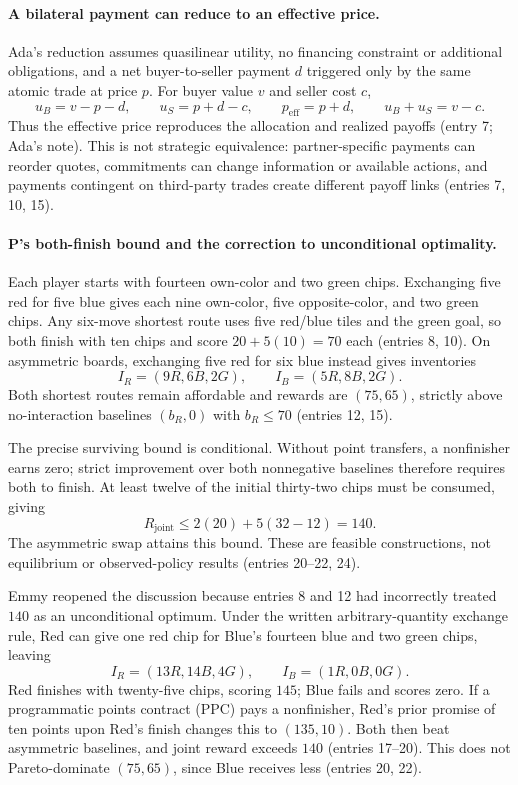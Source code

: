 \documentclass{article}
\begin{document}
\paragraph{A bilateral payment can reduce to an effective price.}
Ada's reduction assumes quasilinear utility, no financing constraint or additional obligations, and a net
buyer-to-seller payment \(d\) triggered only by the same atomic trade at price \(p\). For buyer value \(v\)
and seller cost \(c\),
\[
u_B=v-p-d,\qquad u_S=p+d-c,\qquad
p_{\mathrm{eff}}=p+d,\qquad u_B+u_S=v-c.
\]
Thus the effective price reproduces the allocation and realized payoffs (entry 7; Ada's note). This is not
strategic equivalence: partner-specific payments can reorder quotes, commitments can change information or
available actions, and payments contingent on third-party trades create different payoff links (entries 7, 10,
15).

\paragraph{P's both-finish bound and the correction to unconditional optimality.}
Each player starts with fourteen own-color and two green chips. Exchanging five red for five blue gives each
nine own-color, five opposite-color, and two green chips. Any six-move shortest route uses five red/blue tiles
and the green goal, so both finish with ten chips and score \(20+5(10)=70\) each (entries 8, 10). On
asymmetric boards, exchanging five red for six blue instead gives inventories
\[
I_R=(9R,6B,2G),\qquad I_B=(5R,8B,2G).
\]
Both shortest routes remain affordable and rewards are \((75,65)\), strictly above no-interaction baselines
\((b_R,0)\) with \(b_R\leq70\) (entries 12, 15).

The precise surviving bound is conditional. Without point transfers, a nonfinisher earns zero; strict
improvement over both nonnegative baselines therefore requires both to finish. At least twelve of the initial
thirty-two chips must be consumed, giving
\[
R_{\mathrm{joint}}\leq 2(20)+5(32-12)=140.
\]
The asymmetric swap attains this bound. These are feasible constructions, not equilibrium or observed-policy
results (entries 20--22, 24).

Emmy reopened the discussion because entries 8 and 12 had incorrectly treated \(140\) as an unconditional
optimum. Under the written arbitrary-quantity exchange rule, Red can give one red chip for Blue's fourteen
blue and two green chips, leaving
\[
I_R=(13R,14B,4G),\qquad I_B=(1R,0B,0G).
\]
Red finishes with twenty-five chips, scoring \(145\); Blue fails and scores zero. If a programmatic points
contract (PPC) pays a nonfinisher, Red's prior promise of ten points upon Red's finish changes this to
\((135,10)\). Both then beat asymmetric baselines, and joint reward exceeds \(140\) (entries 17--20). This
does not Pareto-dominate \((75,65)\), since Blue receives less (entries 20, 22).
\end{document}

